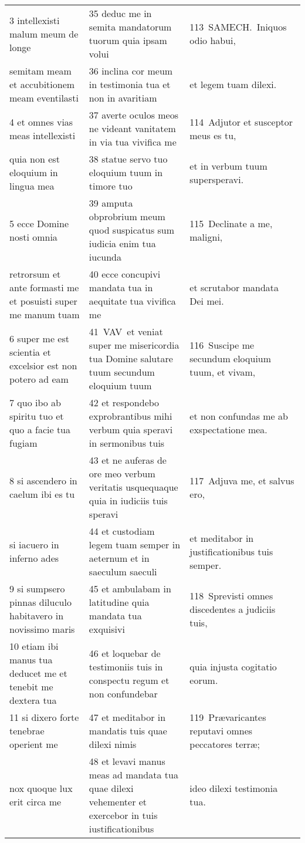 \documentclass{article}
\begin{document}
\begin{longtable}{@{}p{}p{}p{}@{}}
3 intellexisti malum meum de longe	&	35 deduc me in semita mandatorum tuorum quia ipsam volui	&	113 SAMECH. Iniquos odio habui,	\\
semitam meam et accubitionem meam eventilasti	&	36 inclina cor meum in testimonia tua et non in avaritiam	&	et legem tuam dilexi.	\\
4 et omnes vias meas intellexisti	&	37 averte oculos meos ne videant vanitatem in via tua vivifica me	&	114 Adjutor et susceptor meus es tu,	\\
quia non est eloquium in lingua mea	&	38 statue servo tuo eloquium tuum in timore tuo	&	et in verbum tuum supersperavi.	\\
5 ecce Domine nosti omnia	&	39 amputa obprobrium meum quod suspicatus sum iudicia enim tua iucunda	&	115 Declinate a me, maligni,	\\
retrorsum et ante formasti me et posuisti super me manum tuam	&	40 ecce concupivi mandata tua in aequitate tua vivifica me	&	et scrutabor mandata Dei mei.	\\
6 super me est scientia et excelsior est non potero ad eam	&	41 VAV et veniat super me misericordia tua Domine salutare tuum secundum eloquium tuum	&	116 Suscipe me secundum eloquium tuum, et vivam,	\\
7 quo ibo ab spiritu tuo et quo a facie tua fugiam	&	42 et respondebo exprobrantibus mihi verbum quia speravi in sermonibus tuis	&	et non confundas me ab exspectatione mea.	\\
8 si ascendero in caelum ibi es tu	&	43 et ne auferas de ore meo verbum veritatis usquequaque quia in iudiciis tuis speravi	&	117 Adjuva me, et salvus ero,	\\
si iacuero in inferno ades	&	44 et custodiam legem tuam semper in aeternum et in saeculum saeculi	&	et meditabor in justificationibus tuis semper.	\\
9 si sumpsero pinnas diluculo habitavero in novissimo maris	&	45 et ambulabam in latitudine quia mandata tua exquisivi	&	118 Sprevisti omnes discedentes a judiciis tuis,	\\
10 etiam ibi manus tua deducet me et tenebit me dextera tua	&	46 et loquebar de testimoniis tuis in conspectu regum et non confundebar	&	quia injusta cogitatio eorum.	\\
11 si dixero forte tenebrae operient me	&	47 et meditabor in mandatis tuis quae dilexi nimis	&	119 Prævaricantes reputavi omnes peccatores terræ;	\\
nox quoque lux erit circa me	&	48 et levavi manus meas ad mandata tua quae dilexi vehementer et exercebor in tuis iustificationibus	&	ideo dilexi testimonia tua.	\\

\end{longtable}
\end{document}
